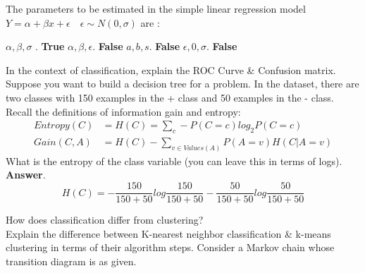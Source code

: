 \documentclass[12pt]{exam}
\begin{document}
\begin{questions}
{%
\renewcommand*\thechoice{\arabic{choice}} 
\renewcommand*\choicelabel{\thechoice)}
%
\question[1] The parameters to be estimated in the simple linear regression model $Y = \alpha + \beta x + \epsilon \quad \epsilon \sim N(0,\sigma)$ are :\\
\begin{multicols}{2}
\begin{choices}
\choice $\alpha , \beta, \sigma$ . \textbf{True}
\choice $\alpha , \beta, \epsilon$. \textbf{False}
\choice $a , b, s$. \textbf{False}
\choice $\epsilon , 0, \sigma$. \textbf{False}
\end{choices}
\end{multicols}
}%
\question[5]
In the context of classification, explain the ROC Curve \& Confusion matrix.
\makeemptybox{3in}
\question[5] Suppose you want to build a decision tree for a problem. In the dataset, there are two classes with 150 examples in the + class and 50 examples in the - class.\\
Recall the definitions of information gain and entropy:
\begin{align*}
Entropy(C) &= H(C) = \sum_c - P(C=c)log_2P(C=c) \\
Gain(C,A) &= H(C) - \sum_{v \in Values(A)} P(A=v) H(C|A=v)
\end{align*}
What is the entropy of the class variable (you can leave this in terms of logs).\\
\textbf{Answer}. 
\begin{equation}
    H(C) = -\frac{150}{150+50} log \frac{150}{150+50} -\frac{50}{150+50} log \frac{50}{150+50}
\end{equation}

\addpoints
\question[5]
How does classification differ from clustering? \\
Explain the difference between K-nearest neighbor classification \& k-means clustering in terms of their algorithm steps.
\makeemptybox{3in}
\question[3]Consider a Markov chain whose transition diagram is as given. 
\noaddpoints %
\begin{parts}

\end{parts}
\end{questions}
\end{document}
